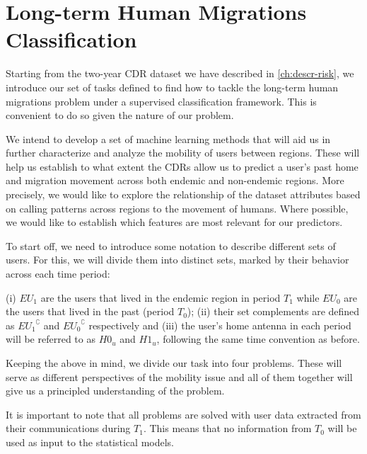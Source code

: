 \section{Long-term Human Migrations Classification}\label{long_term}

Starting from the two-year CDR dataset we have described in \cref{ch:descr-risk}, we introduce our set of tasks defined to find how to tackle the long-term human migrations problem under a supervised classification framework.
This is convenient to do so given the nature of our problem.

We intend to develop a set of machine learning methods that will aid us in further characterize and analyze the mobility of users between regions.
These will help us establish to what extent the CDRs allow us to predict a user's past home and migration movement across both endemic and non-endemic regions.
More precisely, we would like to explore the relationship of the dataset attributes based on calling patterns across regions to the movement of humans.
Where possible, we would like to establish which features are most relevant for our predictors.

To start off, we need to introduce some notation to describe different sets of users.
For this, we will divide them into distinct sets, marked by their behavior across each time period:

\begin{definition}\label{def:endemic_sets_periods}
	(i) $EU_{1}$ are the users that lived in the endemic region in period $T_1$ while $EU_{0}$ are the users that lived in the past (period $T_0$);
	(ii) their set complements are defined as ${ EU_1 }^{\complement}$ and ${ EU_0 }^{\complement}$ respectively and
	(iii) the user's home antenna in each period will be referred to as $H0_u$ and $H1_u$, following the same time convention as before.
\end{definition}



Keeping the above in mind, we divide our task into four problems.
These will serve as different perspectives of the mobility issue and all of them together will give us a principled understanding of the problem.

It is important to note that all problems are solved with user data extracted from their communications during $T_1$.
This means that no information from $T_0$ will be used as input to the statistical models.

